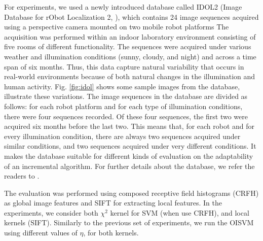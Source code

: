 For experiments, we used a newly introduced database called IDOL2 
(Image Database for rObot Localization 2, \cite{luo:idol2}), 
which contains 24 image sequences acquired using a perspective
camera mounted on two mobile robot platforms The acquisition was
performed within an indoor laboratory environment consisting of five 
rooms of different functionality. The sequences were acquired under
various weather and illumination conditions (sunny, cloudy, and night)
and across a time span of six months. Thus, this data capture natural
variability that occurs in real-world environments because of both 
natural changes in the illumination and human activity. Fig. \ref{fig:idol} 
shows some sample images from the database, illustrate these variations.
The image sequences in the database are divided as follows: for each robot
platform and for each type of illumination conditions, there were
four sequences recorded. Of these four sequences, the first two were 
acquired six months before the last two. This means that, for each robot
and for every illumination condition, there are always two sequences
acquired under similar conditions, and two sequences acquired under very
different conditions. It makes the database suitable for different kinds of
evaluation on the adaptability of an incremental algorithm. For further
details about the database, we refer the readers to \cite{luo:idol2}.

The evaluation was performed using composed receptive field histograms (CRFH)
\cite{Linde:Lindeberg:ICPR04} as global image features and SIFT
\cite{lowe99object} for extracting local features. In the experiments, we
consider both $\chi^2$ kernel for SVM (when use CRFH), and local kernels
\cite{wallraven:iccv03} (SIFT). Similarly to the previous set of experiments,
we run the OISVM using different values of $\eta$, for both kernels.

